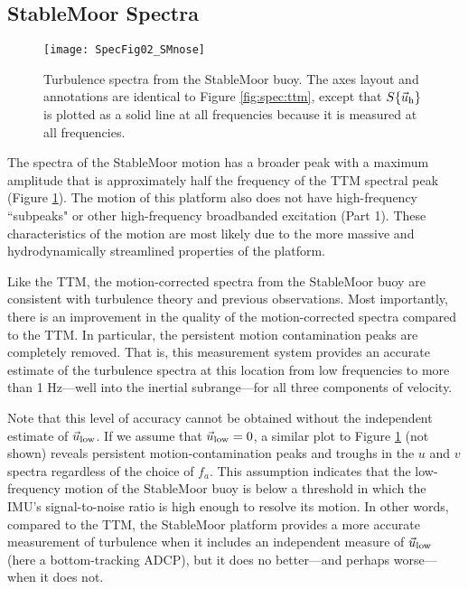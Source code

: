 \subsection{StableMoor Spectra}

\begin{figure*}[th]
  \centering
  \texttt{[image: SpecFig02\_SMnose]}
  \caption{Turbulence spectra from the StableMoor buoy. The axes layout and annotations are identical to Figure \ref{fig:spec:ttm}, except that $S\{\vec{u}_\mathrm{h}\}$ is plotted as a solid line at all frequencies because it is measured at all frequencies. }
  \label{fig:spec:sm}
\end{figure*}

The spectra of the StableMoor motion has a broader peak with a maximum amplitude that is approximately half the frequency of the TTM spectral peak (Figure \ref{fig:spec:sm}). The motion of this platform also does not have high-frequency ``subpeaks" or other high-frequency broadbanded excitation (Part 1).  These characteristics of the motion are most likely due to the more massive and hydrodynamically streamlined properties of the platform. 

Like the TTM, the motion-corrected spectra from the StableMoor buoy are consistent with turbulence theory and previous observations. Most importantly, there is an improvement in the quality of the motion-corrected spectra compared to the TTM. In particular, the persistent motion contamination peaks are completely removed. That is, this measurement system provides an accurate estimate of the turbulence spectra at this location from low frequencies to more than 1 Hz---well into the inertial subrange---for all three components of velocity.

Note that this level of accuracy cannot be obtained without the independent estimate of $\vec{u}_\mathrm{low}$. If we assume that $\vec{u}_\mathrm{low}=0$, a similar plot to Figure \ref{fig:spec:sm} (not shown) reveals persistent motion-contamination peaks and troughs in the $u$ and $v$ spectra regardless of the choice of $f_a$. This assumption indicates that the low-frequency motion of the StableMoor buoy is below a threshold in which the IMU's signal-to-noise ratio is high enough to resolve its motion. In other words, compared to the TTM, the StableMoor platform provides a more accurate measurement of turbulence when it includes an independent measure of $\vec{u}_\mathrm{low}$ (here a bottom-tracking ADCP), but it does no better---and perhaps worse---when it does not.
%
%


